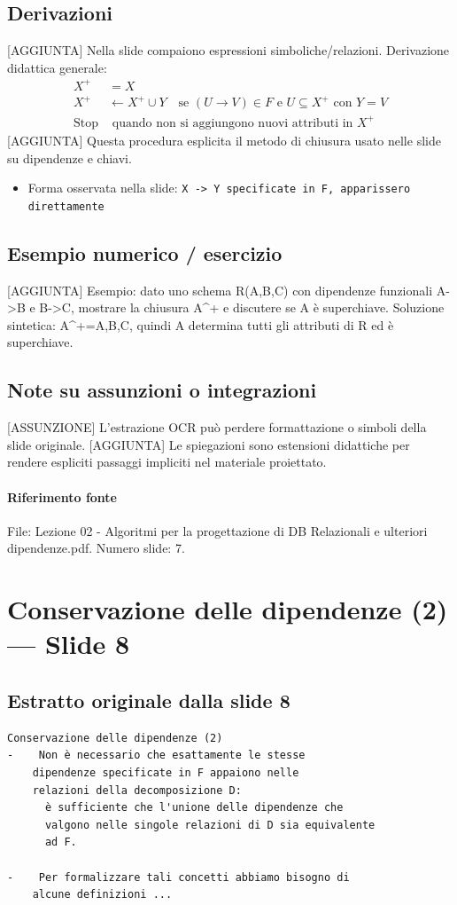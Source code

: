 \documentclass[11pt]{article}
\begin{document}
\subsection*{Derivazioni}
[AGGIUNTA] Nella slide compaiono espressioni simboliche/relazioni. Derivazione didattica generale:
\begin{align*}
X^+ &= X \\
X^+ &\leftarrow X^+ \cup Y \quad \text{se } (U \to V) \in F \text{ e } U \subseteq X^+ \text{ con } Y=V \\
\text{Stop} &\text{ quando non si aggiungono nuovi attributi in } X^+
\end{align*}
[AGGIUNTA] Questa procedura esplicita il metodo di chiusura usato nelle slide su dipendenze e chiavi.
\begin{itemize}[leftmargin=*]
\item Forma osservata nella slide: \texttt{X -> Y specificate in F, apparissero direttamente}
\end{itemize}
\subsection*{Esempio numerico / esercizio}
[AGGIUNTA] Esempio: dato uno schema R(A,B,C) con dipendenze funzionali A->B e B->C, mostrare la chiusura A^+ e discutere se A è superchiave. Soluzione sintetica: A^+={A,B,C}, quindi A determina tutti gli attributi di R ed è superchiave.
\subsection*{Note su assunzioni o integrazioni}
[ASSUNZIONE] L'estrazione OCR può perdere formattazione o simboli della slide originale.
[AGGIUNTA] Le spiegazioni sono estensioni didattiche per rendere espliciti passaggi impliciti nel materiale proiettato.
\paragraph{Riferimento fonte} File: Lezione 02 - Algoritmi per la progettazione di DB Relazionali e ulteriori dipendenze.pdf. Numero slide: 7.
\section{Conservazione delle dipendenze (2) --- Slide 8}
\subsection*{Estratto originale dalla slide 8}
\begin{lstlisting}
Conservazione delle dipendenze (2)
-    Non è necessario che esattamente le stesse
    dipendenze specificate in F appaiono nelle
    relazioni della decomposizione D:
      è sufficiente che l'unione delle dipendenze che
      valgono nelle singole relazioni di D sia equivalente
      ad F.

-    Per formalizzare tali concetti abbiamo bisogno di
    alcune definizioni ...
\end{lstlisting}
\end{document}
